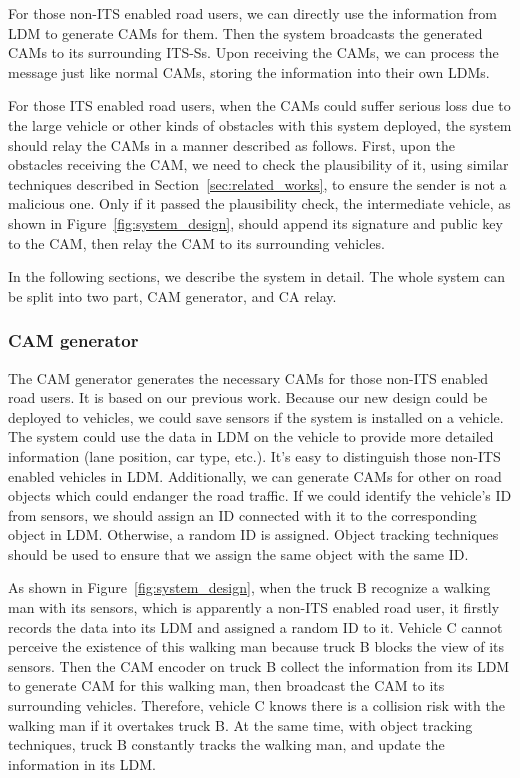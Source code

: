 For those non-ITS enabled road users,
we can directly use the information from LDM to generate CAMs for them.
Then the system broadcasts the generated CAMs to its surrounding ITS-Ss.
Upon receiving the CAMs, we can process the message just like normal CAMs,
storing the information into their own LDMs.

For those ITS enabled road users,
when the CAMs could suffer serious loss due to the large vehicle or other kinds of obstacles with this system deployed,
the system should relay the CAMs in a manner described as follows.
First, upon the obstacles receiving the CAM, we need to check the plausibility of it,
using similar techniques described in Section~\ref{sec:related_works}, to ensure the sender is not a malicious one.
Only if it passed the plausibility check, the intermediate vehicle, as shown in Figure~\ref{fig:system_design},
should append its signature and public key to the CAM, then relay the CAM to its surrounding vehicles.

In the following sections, we describe the system in detail.
The whole system can be split into two part, CAM generator, and CA relay.

\subsubsection{CAM generator}

The CAM generator generates the necessary CAMs for those non-ITS enabled road users.
It is based on our previous work. Because our new design could be deployed to vehicles,
we could save sensors if the system is installed on a vehicle.
The system could use the data in LDM on the vehicle to provide more detailed information (lane position, car type, etc.).
It's easy to distinguish those non-ITS enabled vehicles in LDM.
Additionally, we can generate CAMs for other on road objects which could endanger the road traffic.
If we could identify the vehicle's ID from sensors,
we should assign an ID connected with it to the corresponding object in LDM.
Otherwise, a random ID is assigned.
Object tracking techniques should be used to ensure that we assign the same object with the same ID.

As shown in Figure~\ref{fig:system_design}, when the truck B recognize a walking man with its sensors,
which is apparently a non-ITS enabled road user,
it firstly records the data into its LDM and assigned a random ID to it.
Vehicle C cannot perceive the existence of this walking man because truck B blocks the view of its sensors.
Then the CAM encoder on truck B collect the information from its LDM to generate CAM for this walking man,
then broadcast the CAM to its surrounding vehicles.
Therefore, vehicle C knows there is a collision risk with the walking man if it overtakes truck B.
At the same time, with object tracking techniques,
truck B constantly tracks the walking man, and update the information in its LDM. 

